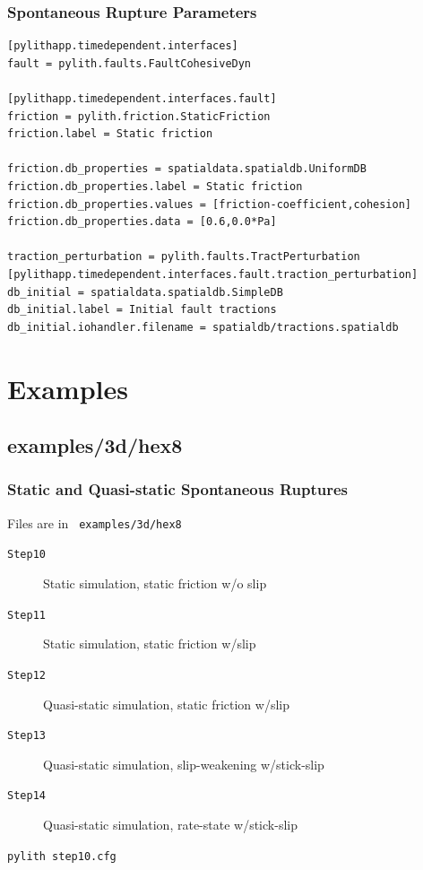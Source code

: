 \documentclass{beamer}
\begin{document}
\begin{frame}[fragile]
  \frametitle{Spontaneous Rupture Parameters}

{\small
\begin{verbatim}
[pylithapp.timedependent.interfaces]
fault = pylith.faults.FaultCohesiveDyn

[pylithapp.timedependent.interfaces.fault]
friction = pylith.friction.StaticFriction
friction.label = Static friction

friction.db_properties = spatialdata.spatialdb.UniformDB
friction.db_properties.label = Static friction
friction.db_properties.values = [friction-coefficient,cohesion]
friction.db_properties.data = [0.6,0.0*Pa]

traction_perturbation = pylith.faults.TractPerturbation
[pylithapp.timedependent.interfaces.fault.traction_perturbation]
db_initial = spatialdata.spatialdb.SimpleDB
db_initial.label = Initial fault tractions
db_initial.iohandler.filename = spatialdb/tractions.spatialdb
\end{verbatim}
}
  
\end{frame}


\section{Examples}
\subsection{examples/3d/hex8}

\begin{frame}
  \frametitle{Static and Quasi-static Spontaneous Ruptures}
  
  \vfill
  Files are in {\tt\color{red} examples/3d/hex8}
  \vfill

  \begin{description}
  \item[{\tt Step10}] Static simulation, static friction w/o slip
  \item[{\tt Step11}] Static simulation, static friction w/slip
  \item[{\tt Step12}] Quasi-static simulation, static friction w/slip
  \item[{\tt Step13}] Quasi-static simulation, slip-weakening w/stick-slip
  \item[{\tt Step14}] Quasi-static simulation, rate-state w/stick-slip
  \end{description}
  
  \vfill
  {\tt pylith step10.cfg}
  \vfill

\end{frame}
\end{document}
